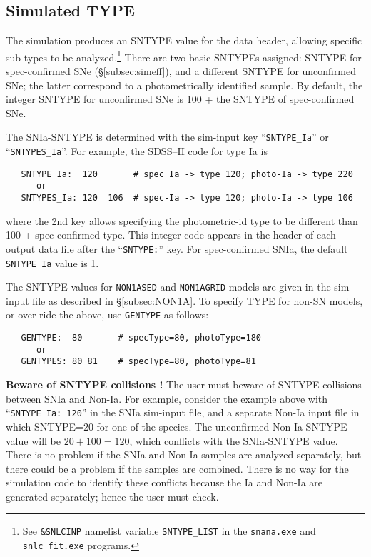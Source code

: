 \documentclass[12pt]{article}
\begin{document}
{%
  \clearpage
  \subsection{Simulated TYPE}
  \label{subsec:sim_sntype}


The simulation produces an SNTYPE value for the data header,
allowing specific sub-types to be analyzed.\footnote{See
{\tt \&SNLCINP} namelist variable {\tt SNTYPE\_LIST}
in the {\tt snana.exe} and {\tt snlc\_fit.exe} programs.}
There are two basic SNTYPEs assigned: 
SNTYPE for spec-confirmed SNe (\S\ref{subsec:simeff}),
and a different SNTYPE for unconfirmed SNe;
the latter correspond to a photometrically identified sample.
By default, the integer SNTYPE for unconfirmed SNe 
is 100 + the SNTYPE of spec-confirmed SNe. 



The SNIa-SNTYPE is determined with the sim-input key 
``{\tt SNTYPE\_Ia}'' or ``{\tt SNTYPES\_Ia}''. 
For example, the SDSS--II code for type Ia is
\begin{verbatim}
   SNTYPE_Ia:  120       # spec Ia -> type 120; photo-Ia -> type 220
      or
   SNTYPES_Ia: 120  106  # spec-Ia -> type 120; photo-Ia -> type 106
\end{verbatim}
where the 2nd key allows specifying the photometric-id type
to be different than 100 + spec-confirmed type.
This integer code appears in the header of each output 
data file after the ``{\tt SNTYPE:}'' key. 
For spec-confirmed SNIa, the default {\tt SNTYPE\_Ia} value is 1.


The SNTYPE values for {\tt NON1ASED} and {\tt NON1AGRID} models 
are given in the sim-input file as described in \S\ref{subsec:NON1A}.
To specify TYPE for non-SN models, or over-ride the above,
use {\tt GENTYPE} as follows:
\begin{verbatim}
   GENTYPE:  80       # specType=80, photoType=180
      or
   GENTYPES: 80 81    # specType=80, photoType=81
\end{verbatim}


\bigskip
{\bf Beware of SNTYPE collisions !}
The user must beware of SNTYPE collisions between SNIa and Non-Ia.
For example, consider the example above with 
``{\tt SNTYPE\_Ia: 120}'' in the SNIa sim-input file,
and a separate Non-Ia input file in which SNTYPE=20
for one of the species. The unconfirmed Non-Ia SNTYPE
value will be $20+100 = 120$, which conflicts with the
SNIa-SNTYPE value. There is no problem if the SNIa and
Non-Ia samples are analyzed separately, but there could
be a problem if the samples are combined. There is no
way for the simulation code to identify these conflicts because
the Ia and Non-Ia are generated separately; hence the
user must check.


}
\end{document}
